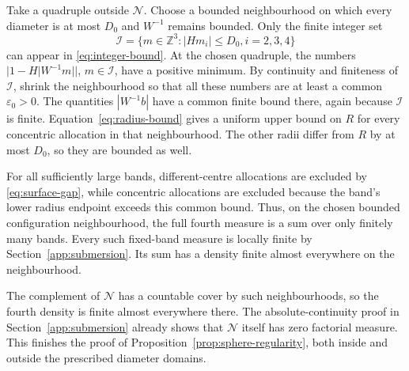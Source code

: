 \documentclass[11pt,a4paper]{article}
\numberwithin{equation}{section}
\theoremstyle{definition}
\theoremstyle{remark}
\begin{document}
Take a quadruple outside $\mathcal N$. Choose a bounded neighbourhood on
which every diameter is at most $D_0$ and $W^{-1}$ remains bounded. Only
the finite integer set
\[
 \mathcal I=\{m\in\mathbb Z^3: |Hm_i|\leq D_0, i=2,3,4\}
\]
can appear in \eqref{eq:integer-bound}. At the chosen quadruple, the
numbers $|1-H|W^{-1}m||$, $m\in\mathcal I$, have a positive minimum.
By continuity and finiteness of $\mathcal I$, shrink the neighbourhood
so that all these numbers are at least a common $\varepsilon_0>0$.
The quantities $|W^{-1}b|$ have a common finite bound there, again because
$\mathcal I$ is finite. Equation~\eqref{eq:radius-bound} gives a uniform
upper bound on $R$ for every concentric allocation in that neighbourhood.
The other radii differ from $R$ by at most $D_0$, so they are bounded
as well.

For all sufficiently large bands, different-centre allocations are
excluded by \eqref{eq:surface-gap}, while concentric allocations are
excluded because the band's lower radius endpoint exceeds this common
bound. Thus, on the chosen bounded configuration neighbourhood, the full
fourth measure is a sum over only finitely many bands. Every such
fixed-band measure is locally finite by
Section~\ref{app:submersion}. Its sum has a density finite almost
everywhere on the neighbourhood.

The complement of $\mathcal N$ has a countable cover by such
neighbourhoods, so the fourth density is finite almost everywhere there.
The absolute-continuity proof in Section~\ref{app:submersion} already
shows that $\mathcal N$ itself has zero factorial measure. This finishes
the proof of Proposition~\ref{prop:sphere-regularity}, both inside and
outside the prescribed diameter domains.
\end{document}
